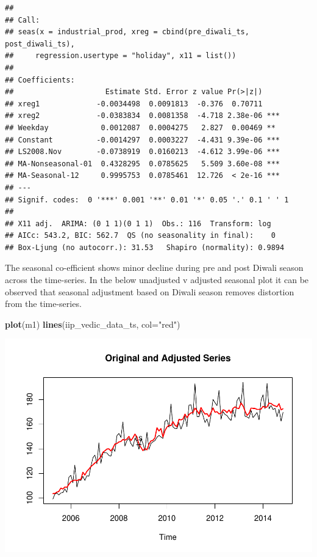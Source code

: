\documentclass[
]{article}
\newenvironment{Shaded}{\begin{snugshade}}{\end{snugshade}}
\newcommand{\AttributeTok}[1]{\textcolor[rgb]{0.13,0.29,0.53}{#1}}
\newcommand{\FunctionTok}[1]{\textcolor[rgb]{0.13,0.29,0.53}{\textbf{#1}}}
\newcommand{\NormalTok}[1]{#1}
\newcommand{\StringTok}[1]{\textcolor[rgb]{0.31,0.60,0.02}{#1}}
\begin{document}
\begin{verbatim}
## 
## Call:
## seas(x = industrial_prod, xreg = cbind(pre_diwali_ts, post_diwali_ts), 
##     regression.usertype = "holiday", x11 = list())
## 
## Coefficients:
##                     Estimate Std. Error z value Pr(>|z|)    
## xreg1             -0.0034498  0.0091813  -0.376  0.70711    
## xreg2             -0.0383834  0.0081358  -4.718 2.38e-06 ***
## Weekday            0.0012087  0.0004275   2.827  0.00469 ** 
## Constant          -0.0014297  0.0003227  -4.431 9.39e-06 ***
## LS2008.Nov        -0.0738919  0.0160213  -4.612 3.99e-06 ***
## MA-Nonseasonal-01  0.4328295  0.0785625   5.509 3.60e-08 ***
## MA-Seasonal-12     0.9995753  0.0785461  12.726  < 2e-16 ***
## ---
## Signif. codes:  0 '***' 0.001 '**' 0.01 '*' 0.05 '.' 0.1 ' ' 1
## 
## X11 adj.  ARIMA: (0 1 1)(0 1 1)  Obs.: 116  Transform: log
## AICc: 543.2, BIC: 562.7  QS (no seasonality in final):    0  
## Box-Ljung (no autocorr.): 31.53   Shapiro (normality): 0.9894
\end{verbatim}

The seasonal co-efficient shows minor decline during pre and post Diwali
season across the time-series. In the below unadjusted v adjusted
seasonal plot it can be observed that seasonal adjustment based on
Diwali season removes distortion from the time-series.

\begin{Shaded}
\begin{Highlighting}[]
\FunctionTok{plot}\NormalTok{(m1)}
\FunctionTok{lines}\NormalTok{(iip\_vedic\_data\_ts, }\AttributeTok{col=}\StringTok{"red"}\NormalTok{)}
\end{Highlighting}
\end{Shaded}

\includegraphics{regressors_of_diwali_seasonality_for_industrial_production_files/figure-latex/unnamed-chunk-11-1.pdf}
\end{document}
